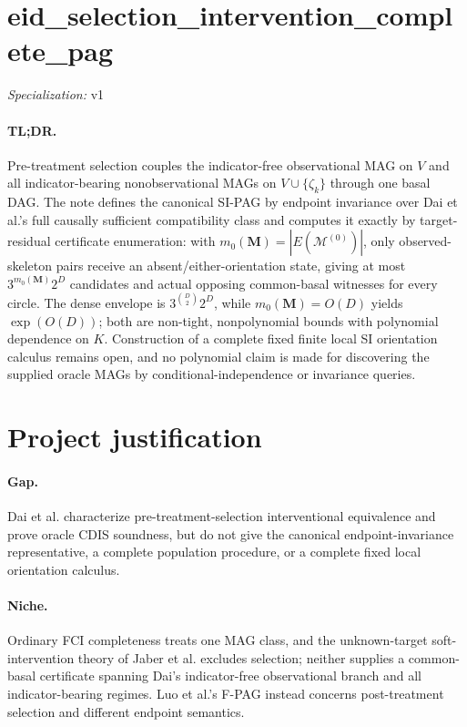 \documentclass{article}
\begin{document}
\sloppy

\section*{eid\_\allowbreak{}selection\_\allowbreak{}intervention\_\allowbreak{}complete\_\allowbreak{}pag}

\noindent\textit{Specialization:} v1\par

\paragraph{TL;DR.} Pre-treatment selection couples the indicator-free observational MAG on \(V\) and all indicator-bearing nonobservational MAGs on \(V\cup\{\zeta_k\}\) through one basal DAG.  The note defines the canonical SI-PAG by endpoint invariance over Dai et al.'s full causally sufficient compatibility class and computes it exactly by target-residual certificate enumeration: with \(m_0(\mathbf M)=|E(\mathcal M^{(0)})|\), only observed-skeleton pairs receive an absent/either-orientation state, giving at most \(3^{m_0(\mathbf M)}2^D\) candidates and actual opposing common-basal witnesses for every circle.  The dense envelope is \(3^{\binom D2}2^D\), while \(m_0(\mathbf M)=O(D)\) yields \(\exp(O(D))\); both are non-tight, nonpolynomial bounds with polynomial dependence on \(K\).  Construction of a complete fixed finite local SI orientation calculus remains open, and no polynomial claim is made for discovering the supplied oracle MAGs by conditional-independence or invariance queries.

\section{Project justification}

\paragraph{Gap.} Dai et al. characterize pre-treatment-selection interventional equivalence and prove oracle CDIS soundness, but do not give the canonical endpoint-invariance representative, a complete population procedure, or a complete fixed local orientation calculus.

\paragraph{Niche.} Ordinary FCI completeness treats one MAG class, and the unknown-target soft-intervention theory of Jaber et al. excludes selection; neither supplies a common-basal certificate spanning Dai's indicator-free observational branch and all indicator-bearing regimes.  Luo et al.'s F-PAG instead concerns post-treatment selection and different endpoint semantics.
\end{document}

